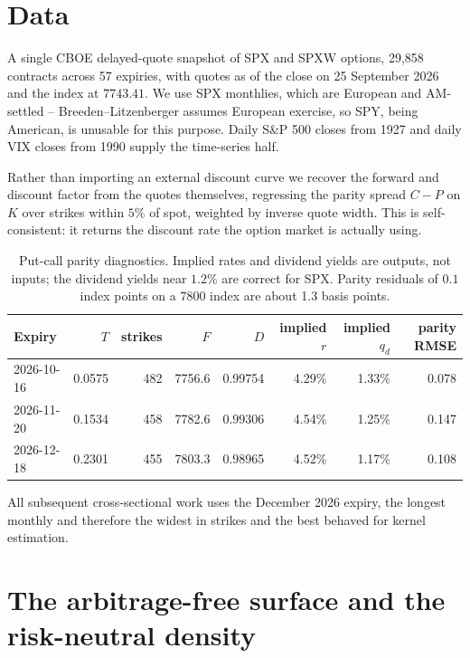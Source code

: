 \documentclass[11pt,a4paper]{article}
\theoremstyle{remark}
\begin{document}
\section{Data}
\label{sec:data}

A single CBOE delayed-quote snapshot of SPX and SPXW options, 29{,}858
contracts across 57 expiries, with quotes as of the close on 25 September 2026
and the index at $7743.41$. We use SPX monthlies, which are European and
AM-settled -- Breeden--Litzenberger assumes European exercise, so SPY, being
American, is unusable for this purpose. Daily S\&P 500 closes from 1927 and
daily VIX closes from 1990 supply the time-series half.

Rather than importing an external discount curve we recover the forward and
discount factor from the quotes themselves, regressing the parity spread
$C-P$ on $K$ over strikes within $5\%$ of spot, weighted by inverse quote width.
This is self-consistent: it returns the discount rate the option market is
actually using.

\begin{table}[htbp]
\centering
\small
\begin{tabular}{lrrrrrrr}
\toprule
Expiry & $T$ & strikes & $F$ & $D$ & implied $r$ & implied $q_d$ & parity RMSE \\
\midrule
2026-10-16 & 0.0575 & 482 & 7756.6 & 0.99754 & 4.29\% & 1.33\% & 0.078 \\
2026-11-20 & 0.1534 & 458 & 7782.6 & 0.99306 & 4.54\% & 1.25\% & 0.147 \\
2026-12-18 & 0.2301 & 455 & 7803.3 & 0.98965 & 4.52\% & 1.17\% & 0.108 \\
\bottomrule
\end{tabular}
\caption{Put-call parity diagnostics. Implied rates and dividend yields are
outputs, not inputs; the dividend yields near $1.2\%$ are correct for SPX.
Parity residuals of $0.1$ index points on a $7800$ index are about 1.3 basis
points.}
\label{tab:parity}
\end{table}

All subsequent cross-sectional work uses the December 2026 expiry, the longest
monthly and therefore the widest in strikes and the best behaved for kernel
estimation.

\section{The arbitrage-free surface and the risk-neutral density}
\label{sec:surface}
\end{document}
